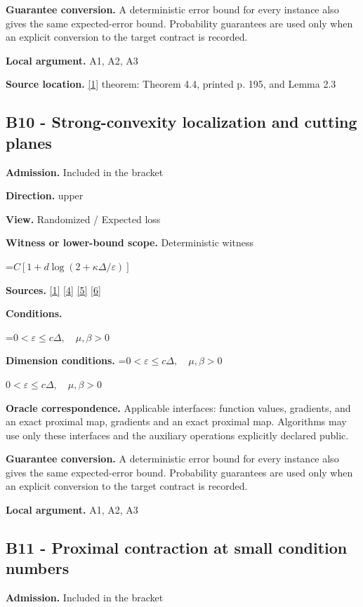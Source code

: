\documentclass[10pt,a4paper]{article}
\newcommand{\AtlasMath}[1]{\par\begingroup\centering\setbox0=\hbox{$\displaystyle #1$}\ifdim\wd0>1.4\linewidth\typeout{ATLAS WIDE FORMULA: \the\wd0}\fi\ifdim\wd0>\linewidth\resizebox{\linewidth}{!}{\box0}\else\box0\fi\par\endgroup}
\newcommand{\AtlasInlineMath}[1]{\begingroup\setbox0=\hbox{$#1$}\ifdim\wd0>.4\linewidth\endgroup\AtlasMath{#1}\else\endgroup$#1$\fi}
\begin{document}
\textbf{Guarantee conversion.} A deterministic error bound for every instance also gives the same expected-error bound. Probability guarantees are used only when an explicit conversion to the target contract is recorded.

\textbf{Local argument.} A1, A2, A3

\textbf{Source location.} \href{https://www.tau.ac.il/~becka/FISTA.pdf}{[1]} theorem: Theorem 4.4, printed p. 195, and Lemma 2.3

\subsection{B10 - Strong-convexity localization and cutting planes}
\textbf{Admission.} Included in the bracket

\textbf{Direction.} upper

\textbf{View.} Randomized / Expected loss

\textbf{Witness or lower-bound scope.} Deterministic witness

\AtlasMath{C[1+d\log(2+\kappa\Delta/\varepsilon)]}
\textbf{Sources.} \href{https://www.tau.ac.il/~becka/FISTA.pdf}{[1]} \href{https://arxiv.org/pdf/1405.4980}{[4]} \href{https://www2.isye.gatech.edu/~nemirovs/MOR_AccuracyCertificates.pdf}{[5]} \href{https://arxiv.org/pdf/2609.20701}{[6]}

\textbf{Conditions.} 
\AtlasMath{0<\varepsilon\le c\Delta,\quad\mu,\beta>0}


\textbf{Dimension conditions.} \AtlasInlineMath{0<\varepsilon\le c\Delta,\quad\mu,\beta>0}

\textbf{Oracle correspondence.} Applicable interfaces: function values, gradients, and an exact proximal map, gradients and an exact proximal map. Algorithms may use only these interfaces and the auxiliary operations explicitly declared public.

\textbf{Guarantee conversion.} A deterministic error bound for every instance also gives the same expected-error bound. Probability guarantees are used only when an explicit conversion to the target contract is recorded.

\textbf{Local argument.} A1, A2, A3

\subsection{B11 - Proximal contraction at small condition numbers}
\textbf{Admission.} Included in the bracket
\end{document}
